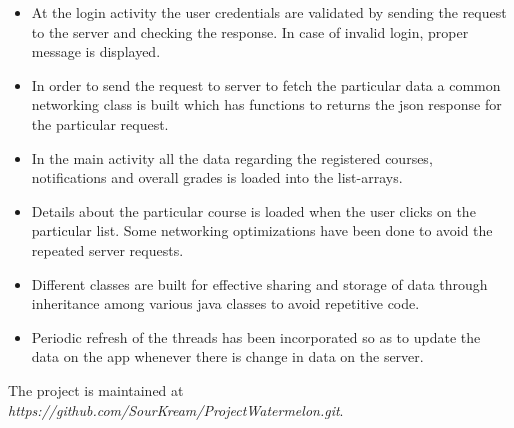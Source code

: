 \documentclass{article}
\begin{document}
\begin{itemize}
\item At the login activity the user credentials are validated by sending the request to the server and checking the response. In case of invalid login, proper message is displayed.\\
\item In order to send the request to server to fetch the particular data a common networking class is built which has functions to  returns the json response for the particular request.\\
\item In the main activity all the data regarding the registered courses, notifications and overall grades is loaded into the list-arrays. \\
\item Details about the particular course is loaded when the user clicks on the particular list. Some networking optimizations have been done to avoid the repeated server requests.\\
\item Different classes are built for effective sharing and storage of data through inheritance among various java classes to avoid repetitive code.\\
\item Periodic refresh of the threads has been incorporated so as to update the data on the app whenever there is change in data on the server.\\


\end{itemize}
The project is maintained at {\em https://github.com/SourKream/ProjectWatermelon.git}.



\nocite{*}
\end{document}
